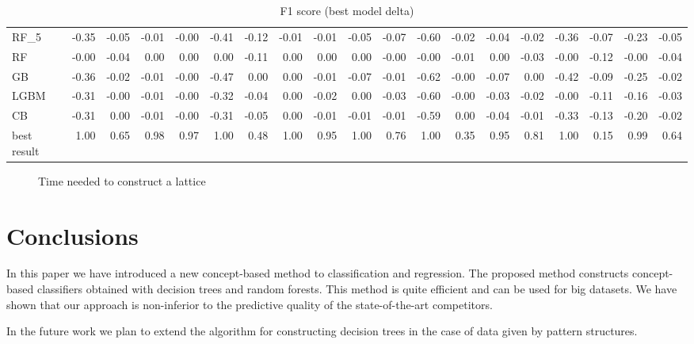 \documentclass[runningheads]{llncs}
\begin{document}
\begin{table}[]
\begin{tabular}{l||rr|rr|rr|rr|rr|rr|rr|rr||rr}
RF\_5             & -0.35 & -0.05 &  -0.01 & -0.00 & -0.41 & -0.12 &  -0.01 & -0.01 & -0.05 & -0.07 & -0.60 & -0.02 &      -0.04 & -0.02 &   -0.36 & -0.07 &     -0.23 & -0.05 \\
RF               & -0.00 & -0.04 &   0.00 &  0.00 &  0.00 & -0.11 &   0.00 &  0.00 &  0.00 & -0.00 & -0.00 & -0.01 &       0.00 & -0.03 &   -0.00 & -0.12 &     -0.00 & -0.04 \\
GB               & -0.36 & -0.02 &  -0.01 & -0.00 & -0.47 &  0.00 &   0.00 & -0.01 & -0.07 & -0.01 & -0.62 & -0.00 &      -0.07 &  0.00 &   -0.42 & -0.09 &     -0.25 & -0.02 \\
LGBM             & -0.31 & -0.00 &  -0.01 & -0.00 & -0.32 & -0.04 &   0.00 & -0.02 &  0.00 & -0.03 & -0.60 & -0.00 &      -0.03 & -0.02 &   -0.00 & -0.11 &     -0.16 & -0.03 \\
CB               & -0.31 &  0.00 &  -0.01 & -0.00 & -0.31 & -0.05 &   0.00 & -0.01 & -0.01 & -0.01 & -0.59 &  0.00 &      -0.04 & -0.01 &   -0.33 & -0.13 &     -0.20 & -0.02 \\
\hline
\hline
best result         &  1.00 &  0.65 &   0.98 &  0.97 &  1.00 &  0.48 &   1.00 &  0.95 &  1.00 &  0.76 &  1.00 &  0.35 &       0.95 &  0.81 &    1.00 &  0.15 &      0.99 &  0.64 \\
\bottomrule
\end{tabular}
    \caption{F1 score (best model delta)}
    \label{tab:f1_delta}
\end{table}


\begin{figure}[]
\caption{Time needed to construct a lattice} \label{fig_time}
\end{figure}


\section{Conclusions}
In this paper we have introduced a new concept-based method to classification and regression. The proposed method constructs concept-based classifiers obtained with decision trees and random forests.  This method is quite efficient and can be used for big datasets. We have shown that our approach is non-inferior to the  predictive quality of the state-of-the-art competitors.

In the future work we plan to extend the algorithm for constructing decision trees in the case of data given by pattern structures. %
\end{document}
